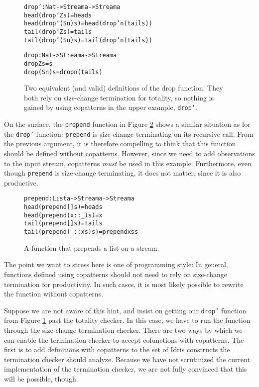 \begin{figure}
\begin{alltt}
drop' : Nat -> Stream a -> Stream a
head (drop' Z     s) = head s
head (drop' (S n) s) = head (drop' n (tail s))
tail (drop' Z     s) = tail s
tail (drop' (S n) s) = tail (drop' n (tail s))

drop : Nat -> Stream a -> Stream a
drop Z     s = s
drop (S n) s = drop n (tail s)
\end{alltt}
\caption{Two equivalent (and valid) definitions of the drop function. They both rely on size-change termination for totality, so nothing is gained by using copatterns in the upper example, \texttt{drop'}.}
\label{fig:drop_drop'}
\end{figure}

On the surface, the \texttt{prepend} function in Figure \ref{fig:prepend} shows a similar situation as for the \texttt{drop'} function: \texttt{prepend} is size-change terminating on its recursive call. From the previous argument, it is therefore compelling to think that this function should be defined without copatterns. However, since we need to add observations to the input stream, copatterns \emph{must} be used in this example. Furthermore, even though \texttt{prepend} is size-change terminating, it does not matter, since it is also productive.

\begin{figure}
\begin{alltt}
prepend : List a -> Stream a -> Stream a
head (prepend []      s) = head s
head (prepend (x::_)  s) = x
tail (prepend []      s) = tail s
tail (prepend (_::xs) s) = prepend xs s
\end{alltt}
\caption{A function that prepends a list on a stream.}
\label{fig:prepend}
\end{figure}

The point we want to stress here is one of programming style: In general, functions defined using copatterns should not need to rely on size-change termination for productivity. In such cases, it is most likely possible to rewrite the function without copatterns. 

Suppose we are not aware of this hint, and insist on getting our \texttt{drop'} function from Figure \ref{fig:drop_drop'} past the totality checker. In this case, we have to run the function through the size-change termination checker. There are two ways by which we can enable the termination checker to accept cofunctions with copatterns. The first is to add definitions with copatterns to the set of Idris constructs the termination checker should analyze. Because we have not scrutinized the current implementation of the termination checker, we are not fully convinced that this will be possible, though.

